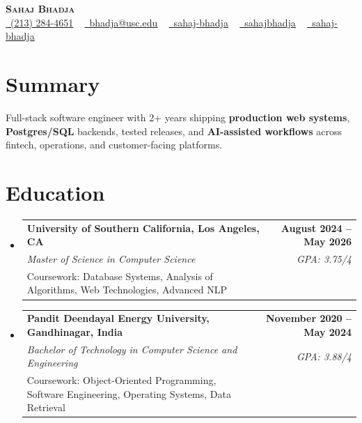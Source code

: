 \documentclass[letterpaper,10pt]{article}
\makeatletter
\newcommand{\sectionGap}{\vspace{-8pt}}
\newcommand{\resumeEduSubheading}[5]{\vspace{-1pt}\item\begin{tabular*}{1.0\textwidth}[t]{l@{\extracolsep{\fill}}r}\textbf{#1} & \textbf{\small #2} \\\textit{\small #3} & \textit{\small #4} \\\small #5 & \\\end{tabular*}\vspace{-4pt}}
\newcommand{\resumeSubHeadingListStart}{\begin{itemize}[leftmargin=0.0in, label={}]}
\newcommand{\resumeSubHeadingListEnd}{\end{itemize}}
\makeatother
\begin{document}
\begin{center}
{\Huge \scshape \textbf{Sahaj Bhadja}} \\ \vspace{1pt}
\small \href{tel:2132844651}{\faPhone\ \underline{(213) 284-4651}} ~ \href{mailto:bhadja@usc.edu}{\raisebox{-0.2\height}\faEnvelope\ \underline{bhadja@usc.edu}} ~
\href{https://www.linkedin.com/in/sahaj-bhadja/}{\raisebox{-0.2\height}\faLinkedin\ \underline{sahaj-bhadja}} ~ \href{https://github.com/SAHAJ-BHADJA}{\raisebox{-0.2\height}\faGithub\ \underline{sahajbhadja}} ~
\href{https://sahaj-bhadja.vercel.app/}{\raisebox{-0.2\height}\faGlobe\ \underline{sahaj-bhadja}}
\end{center}
\vspace{-16pt}
\section{Summary}
\begin{itemize}[leftmargin=0.15in, label={}]
\small{\item{Full-stack software engineer with 2+ years shipping \textbf{production web systems}, \textbf{Postgres/SQL} backends, tested releases, and \textbf{AI-assisted workflows} across fintech, operations, and customer-facing platforms.}}
\end{itemize}
\sectionGap
\section{Education}
\resumeSubHeadingListStart
\resumeEduSubheading{University of Southern California, Los Angeles, CA}{August 2024 -- May 2026}{Master of Science in Computer Science}{GPA: 3.75/4}{Coursework: Database Systems, Analysis of Algorithms, Web Technologies, Advanced NLP}
\resumeEduSubheading{Pandit Deendayal Energy University, Gandhinagar, India}{November 2020 -- May 2024}{Bachelor of Technology in Computer Science and Engineering}{GPA: 3.88/4}{Coursework: Object-Oriented Programming, Software Engineering, Operating Systems, Data Retrieval}
\resumeSubHeadingListEnd
\sectionGap
\end{document}
